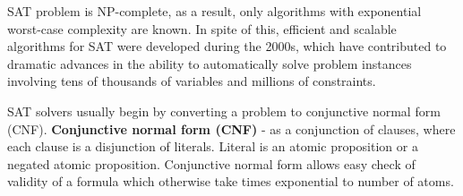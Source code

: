 SAT problem is NP-complete, as a result, only algorithms with exponential 
worst-case complexity are known. In spite of this, efficient and 
scalable algorithms for SAT were developed during the 2000s, which have 
contributed to dramatic advances in the ability to automatically 
solve problem instances involving tens of thousands of variables and 
millions of constraints.%

SAT solvers usually begin by converting a problem to conjunctive normal form (CNF).
\textbf{Conjunctive normal form (CNF)} - as a conjunction of clauses, where each clause is a disjunction of literals.
Literal is an atomic proposition or a negated atomic proposition.
Conjunctive normal form allows easy check of validity of a formula which otherwise take times exponential to number of atoms.




